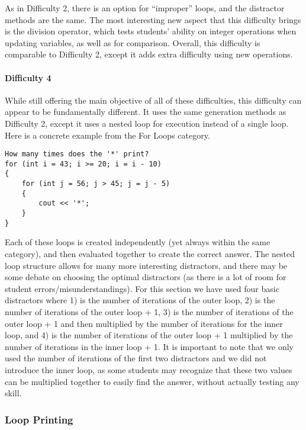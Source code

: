 \documentclass{article}
\begin{document}
As in Difficulty 2, there is an option for ``improper'' loops, and the distractor methods are the same. The most interesting new aspect that this difficulty brings is the division operator, which tests students' ability on integer operations
when updating variables, as well as for comparison. Overall, this difficulty is comparable to Difficulty 2, except it adds extra difficulty using new operations. 

\paragraph{Difficulty 4} \hfill \par
While still offering the main objective of all of these difficulties, this difficulty can appear to be fundamentally different. It uses the same generation methods as Difficulty 2, except it uses 
a nested loop for execution instead of a single loop. Here is a concrete example from the For Loops category.

\begin{lstlisting}
How many times does the '*' print? 
for (int i = 43; i >= 20; i = i - 10) 
{ 
	for (int j = 56; j > 45; j = j - 5) 
	{ 
		cout << '*'; 
	} 
}
\end{lstlisting}

Each of these loops is created independently (yet always within the same category), and then evaluated together to create the correct answer. The nested loop structure allows for many more
interesting distractors, and there may be some debate on choosing the optimal distractors (as there is a lot of room for student errors/misunderstandings). For this section we have used four
basic distractors where 1)  is the number of iterations of the outer loop, 2) is the number of iterations of the outer loop + 1, 3) is the number of iterations of the outer loop + 1 and then 
multiplied by the number of iterations for the inner loop, and 4) is the number of iterations of the outer loop + 1 multiplied by the number of iterations in the inner loop + 1. It is important to 
note that we only used the number of iterations of the first two distractors and we did not introduce the inner loop, as some students may recognize that these two values can be multiplied 
together to easily find the answer, without actually testing any skill.

\subsubsection{Loop Printing}
\end{document}
